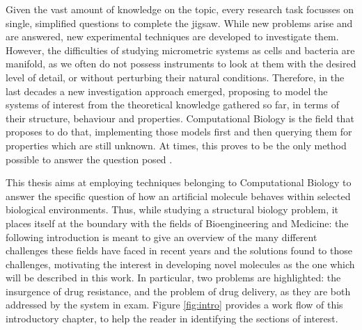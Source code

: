 Given the vast amount of knowledge on the topic, every research task focusses on single, simplified questions to complete the jigsaw. While new problems arise and are answered, new experimental techniques are developed to investigate them. However, the difficulties of studying micrometric systems as cells and bacteria are manifold, as we often do not possess instruments to look at them with the desired level of detail, or without perturbing their natural conditions. Therefore, in the last decades a new investigation approach emerged, proposing to model the systems of interest from the theoretical knowledge gathered so far, in terms of their structure, behaviour and properties.
%
Computational Biology is the field that proposes to do that, implementing those models first and then querying them for properties which are still unknown. At times, this proves to be the only method possible to answer the question posed \citep{Lee2009,Dror2012,Chou2015,Leipzig2016}.

This thesis aims at employing techniques belonging to Computational Biology to answer the specific question of how an artificial molecule behaves within selected biological environments.
%
Thus, while studying a structural biology problem, it places itself at the boundary with the fields of Bioengineering and Medicine: the following introduction is meant to give an overview of the many different challenges these fields have faced in recent years and the solutions found to those challenges, motivating the interest in developing novel molecules as the one which will be described in this work. In particular, two problems are highlighted: the insurgence of drug resistance, and the problem of drug delivery, as they are both addressed by the system in exam. Figure \ref{fig:intro} provides a work flow of this introductory chapter, to help the reader in identifying the sections of interest.

